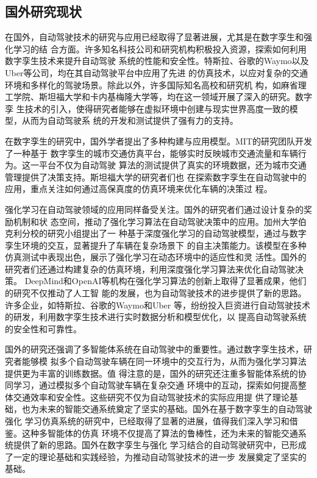 \subsection{国外研究现状}

在国外，自动驾驶技术的研究与应用已经取得了显著进展，尤其是在数字孪生和强化学习的结
合方面。许多知名科技公司和研究机构积极投入资源，探索如何利用数字孪生技术来提升自动驾驶
系统的性能和安全性。特斯拉、谷歌的Waymo以及Uber等公司，均在其自动驾驶平台中应用了先进
的仿真技术，以应对复杂的交通环境和多样化的驾驶场景。除此以外，许多国际知名高校和研究机
构，如麻省理工学院、斯坦福大学和卡内基梅隆大学等，均在这一领域开展了深入的研究。数字孪
生技术的引入，使得研究者能够在虚拟环境中创建与现实世界高度一致的模型，从而为自动驾驶系
统的开发和测试提供了强有力的支持。

在数字孪生的研究中，国外学者提出了多种构建与应用模型。MIT的研究团队开发了一种基于
数字孪生的城市交通仿真平台，能够实时反映城市交通流量和车辆行为。这一平台不仅为自动驾驶
算法的测试提供了真实的环境数据，还为城市交通管理提供了决策支持。斯坦福大学的研究者们也
在探索数字孪生在自动驾驶中的应用，重点关注如何通过高保真度的仿真环境来优化车辆的决策过
程。

强化学习在自动驾驶领域的应用同样备受关注。国外的研究者们通过设计复杂的奖励机制和状
态空间，推动了强化学习算法在自动驾驶决策中的应用。加州大学伯克利分校的研究小组提出了一
种基于深度强化学习的自动驾驶模型，通过与数字孪生环境的交互，显著提升了车辆在复杂场景下
的自主决策能力。该模型在多种仿真测试中表现出色，展示了强化学习在动态环境中的适应性和灵
活性。国外的研究者们还通过构建复杂的仿真环境，利用深度强化学习算法来优化自动驾驶决策。
DeepMind和OpenAI等机构在强化学习算法的创新上取得了显著成果，他们的研究不仅推动了人工智
能的发展，也为自动驾驶技术的进步提供了新的思路。许多企业，如特斯拉、谷歌的Waymo和Uber
等，纷纷投入巨资进行自动驾驶技术的研发，利用数字孪生技术进行实时数据分析和模型优化，以
提高自动驾驶系统的安全性和可靠性。

国外的研究还强调了多智能体系统在自动驾驶中的重要性。通过数字孪生技术，研究者能够模
拟多个自动驾驶车辆在同一环境中的交互行为，从而为强化学习算法提供更为丰富的训练数据。值
得注意的是，国外的研究还注重多智能体系统的协同学习，通过模拟多个自动驾驶车辆在复杂交通
环境中的互动，探索如何提高整体交通效率和安全性。这些研究不仅为自动驾驶技术的实际应用提
供了理论基础，也为未来的智能交通系统奠定了坚实的基础。国外在基于数字孪生的自动驾驶强化
学习仿真系统的研究中，已经取得了显著的进展，值得我们深入学习和借鉴。这种多智能体的仿真
环境不仅提高了算法的鲁棒性，还为未来的智能交通系统提供了新的思路。国外在数字孪生与强化
学习结合的自动驾驶研究中，已形成了一定的理论基础和实践经验，为推动自动驾驶技术的进一步
发展奠定了坚实的基础。





\begin{tabular}{l l}
\end{tabular}


